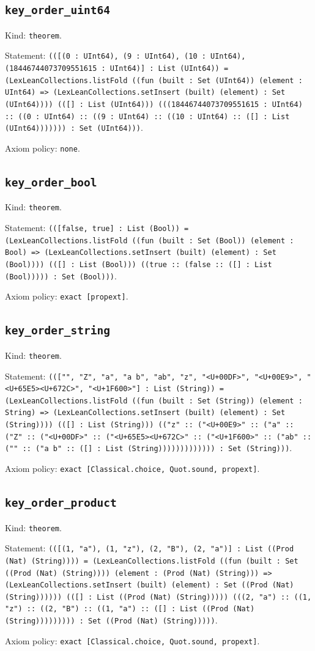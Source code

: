 \documentclass[11pt]{article}
\begin{document}
\subsection*{\texttt{key\_order\_uint64}}
\noindent Kind: \texttt{theorem}.\par
\noindent Statement: \texttt{(([(0 : UInt64), (9 : UInt64), (10 : UInt64), (18446744073709551615 : UInt64)] : List (UInt64)) = (LexLeanCollections.listFold ((fun (built : Set (UInt64)) (element : UInt64) => (LexLeanCollections.setInsert (built) (element) : Set (UInt64)))) (([] : List (UInt64))) (((18446744073709551615 : UInt64) :: ((0 : UInt64) :: ((9 : UInt64) :: ((10 : UInt64) :: ([] : List (UInt64))))))) : Set (UInt64)))}.\par
\noindent Axiom policy: \texttt{none}.\par
\subsection*{\texttt{key\_order\_bool}}
\noindent Kind: \texttt{theorem}.\par
\noindent Statement: \texttt{(([false, true] : List (Bool)) = (LexLeanCollections.listFold ((fun (built : Set (Bool)) (element : Bool) => (LexLeanCollections.setInsert (built) (element) : Set (Bool)))) (([] : List (Bool))) ((true :: (false :: ([] : List (Bool))))) : Set (Bool)))}.\par
\noindent Axiom policy: \texttt{exact [propext]}.\par
\subsection*{\texttt{key\_order\_string}}
\noindent Kind: \texttt{theorem}.\par
\noindent Statement: \texttt{((["", "Z", "a", "a b", "ab", "z", "<U+00DF>", "<U+00E9>", "<U+65E5><U+672C>", "<U+1F600>"] : List (String)) = (LexLeanCollections.listFold ((fun (built : Set (String)) (element : String) => (LexLeanCollections.setInsert (built) (element) : Set (String)))) (([] : List (String))) (("z" :: ("<U+00E9>" :: ("a" :: ("Z" :: ("<U+00DF>" :: ("<U+65E5><U+672C>" :: ("<U+1F600>" :: ("ab" :: ("" :: ("a b" :: ([] : List (String))))))))))))) : Set (String)))}.\par
\noindent Axiom policy: \texttt{exact [Classical.choice, Quot.sound, propext]}.\par
\subsection*{\texttt{key\_order\_product}}
\noindent Kind: \texttt{theorem}.\par
\noindent Statement: \texttt{(([(1, "a"), (1, "z"), (2, "B"), (2, "a")] : List ((Prod (Nat) (String)))) = (LexLeanCollections.listFold ((fun (built : Set ((Prod (Nat) (String)))) (element : (Prod (Nat) (String))) => (LexLeanCollections.setInsert (built) (element) : Set ((Prod (Nat) (String)))))) (([] : List ((Prod (Nat) (String))))) (((2, "a") :: ((1, "z") :: ((2, "B") :: ((1, "a") :: ([] : List ((Prod (Nat) (String))))))))) : Set ((Prod (Nat) (String)))))}.\par
\noindent Axiom policy: \texttt{exact [Classical.choice, Quot.sound, propext]}.\par
\end{document}
